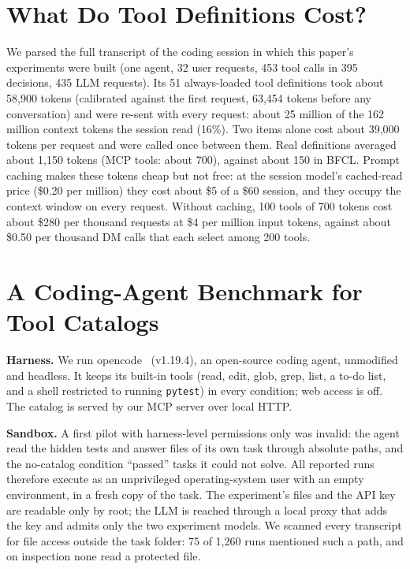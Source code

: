 \documentclass[conference]{IEEEtran}
\begin{document}
\section{What Do Tool Definitions Cost?}\label{sec:overhead}
We parsed the full transcript of the coding session in which this paper's experiments were built (one agent,
32 user requests, 453 tool calls in 395 decisions, 435 LLM requests). Its 51 always-loaded tool definitions
took about 58,900 tokens (calibrated against the first request, 63,454 tokens before any conversation) and
were re-sent with every request: about 25 million of the 162 million context tokens the session read (16\%).
Two items alone cost about 39,000 tokens per request and were called once between them. Real definitions
averaged about 1,150 tokens (MCP tools: about 700), against about 150 in BFCL. Prompt caching makes these
tokens cheap but not free: at the session model's cached-read price (\$0.20 per million) they cost about \$5
of a \$60 session, and they occupy the context window on every request. Without caching, 100 tools of 700
tokens cost about \$280 per thousand requests at \$4 per million input tokens, against about \$0.50 per
thousand DM calls that each select among 200 tools.

\section{A Coding-Agent Benchmark for Tool Catalogs}\label{sec:bench}
\textbf{Harness.} We run opencode~\cite{opencode} (v1.19.4), an open-source coding agent, unmodified and
headless. It keeps its built-in tools (read, edit, glob, grep, list, a to-do list, and a shell restricted to
running \texttt{pytest}) in every condition; web access is off. The catalog is served by our MCP server over
local HTTP.

\textbf{Sandbox.} A first pilot with harness-level permissions only was invalid: the agent read the hidden
tests and answer files of its own task through absolute paths, and the no-catalog condition ``passed'' tasks
it could not solve. All reported runs therefore execute as an unprivileged operating-system user with an empty
environment, in a fresh copy of the task. The experiment's files and the API key are readable only by root;
the LLM is reached through a local proxy that adds the key and admits only the two experiment models. We
scanned every transcript for file access outside the task folder: 75 of 1,260 runs mentioned such a path, and
on inspection none read a protected file.
\end{document}
